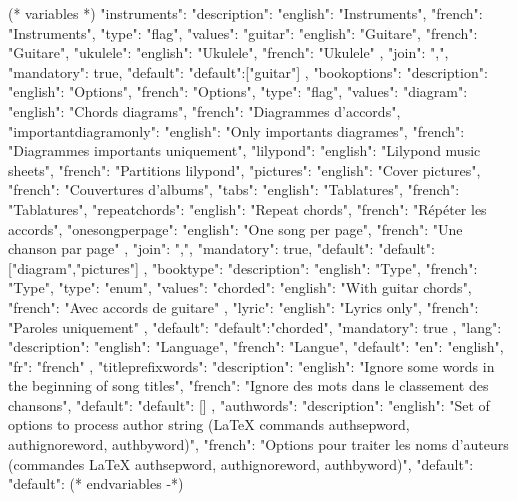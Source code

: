 (* variables *)
{
"instruments": {"description": {"english": "Instruments", "french": "Instruments"},
               "type": "flag",
               "values": {"guitar": {"english": "Guitare", "french": "Guitare"},
                          "ukulele": {"english": "Ukulele", "french": "Ukulele"}
                         },
               "join": ",",
               "mandatory": true,
               "default": {"default":["guitar"]}
            },
"bookoptions": {"description": {"english": "Options", "french": "Options"},
               "type": "flag",
               "values": {"diagram": {"english": "Chords diagrams", "french": "Diagrammes d'accords"},
                          "importantdiagramonly": {"english": "Only importants diagrames", "french": "Diagrammes importants uniquement"},
                          "lilypond": {"english": "Lilypond music sheets", "french": "Partitions lilypond"},
                          "pictures": {"english": "Cover pictures", "french": "Couvertures d'albums"},
                          "tabs": {"english": "Tablatures", "french": "Tablatures"},
                          "repeatchords": {"english": "Repeat chords", "french": "Répéter les accords"},
                          "onesongperpage": {"english": "One song per page", "french": "Une chanson par page"}
                       },
               "join": ",",
               "mandatory": true,
               "default": {"default":["diagram","pictures"]}
            },
"booktype": {"description": {"english": "Type", "french": "Type"},
            "type": "enum",
            "values": {"chorded": {"english": "With guitar chords", "french": "Avec accords de guitare" },
                                   "lyric": {"english": "Lyrics only", "french": "Paroles uniquement"}
                     },
            "default": {"default":"chorded"},
            "mandatory": true
            },
"lang": {"description": {"english": "Language", "french": "Langue"},
         "default": {"en": "english", "fr": "french"}
      },
"titleprefixwords": {"description": {"english": "Ignore some words in the beginning of song titles",
                                     "french": "Ignore des mots dans le classement des chansons"},
                     "default": {"default": []}
                     },
"authwords": {"description": {"english": "Set of options to process author string (LaTeX commands authsepword, authignoreword, authbyword)",
                              "french": "Options pour traiter les noms d'auteurs (commandes LaTeX authsepword, authignoreword, authbyword)"},
               "default": {"default": {}}
               }
}
(* endvariables -*)

